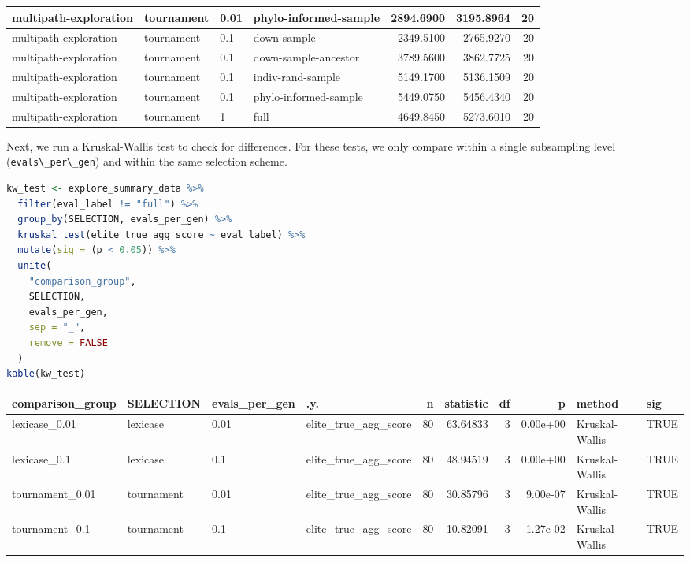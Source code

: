 \documentclass[
]{book}
\newcommand{\passthrough}[1]{#1}
\begin{document}
\begin{tabular}{l|l|l|l|r|r|r}
\hline
multipath-exploration & tournament & 0.01 & phylo-informed-sample & 2894.6900 & 3195.8964 & 20\\
\hline
multipath-exploration & tournament & 0.1 & down-sample & 2349.5100 & 2765.9270 & 20\\
\hline
multipath-exploration & tournament & 0.1 & down-sample-ancestor & 3789.5600 & 3862.7725 & 20\\
\hline
multipath-exploration & tournament & 0.1 & indiv-rand-sample & 5149.1700 & 5136.1509 & 20\\
\hline
multipath-exploration & tournament & 0.1 & phylo-informed-sample & 5449.0750 & 5456.4340 & 20\\
\hline
multipath-exploration & tournament & 1 & full & 4649.8450 & 5273.6010 & 20\\
\hline
\end{tabular}

Next, we run a Kruskal-Wallis test to check for differences.
For these tests, we only compare within a single subsampling level (\passthrough{\lstinline!evals\_per\_gen!}) and within the same selection scheme.

\begin{lstlisting}[language=R]
kw_test <- explore_summary_data %>%
  filter(eval_label != "full") %>%
  group_by(SELECTION, evals_per_gen) %>%
  kruskal_test(elite_true_agg_score ~ eval_label) %>%
  mutate(sig = (p < 0.05)) %>%
  unite(
    "comparison_group",
    SELECTION,
    evals_per_gen,
    sep = "_",
    remove = FALSE
  )
kable(kw_test)
\end{lstlisting}

\begin{tabular}{l|l|l|l|r|r|r|r|l|l}
\hline
comparison\_group & SELECTION & evals\_per\_gen & .y. & n & statistic & df & p & method & sig\\
\hline
lexicase\_0.01 & lexicase & 0.01 & elite\_true\_agg\_score & 80 & 63.64833 & 3 & 0.00e+00 & Kruskal-Wallis & TRUE\\
\hline
lexicase\_0.1 & lexicase & 0.1 & elite\_true\_agg\_score & 80 & 48.94519 & 3 & 0.00e+00 & Kruskal-Wallis & TRUE\\
\hline
tournament\_0.01 & tournament & 0.01 & elite\_true\_agg\_score & 80 & 30.85796 & 3 & 9.00e-07 & Kruskal-Wallis & TRUE\\
\hline
tournament\_0.1 & tournament & 0.1 & elite\_true\_agg\_score & 80 & 10.82091 & 3 & 1.27e-02 & Kruskal-Wallis & TRUE\\
\hline
\end{tabular}
\end{document}

